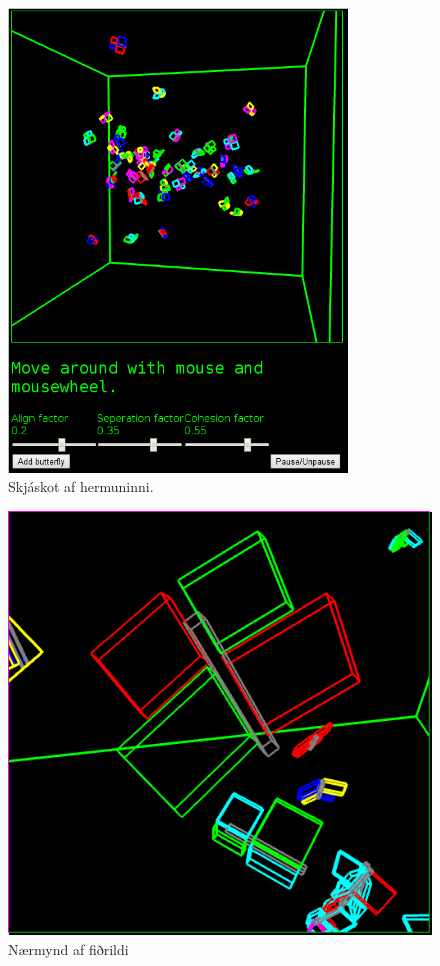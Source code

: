 \documentclass[12pt]{article}
\begin{document}
\begin{figure}[H]
  \centering
  \includegraphics[width=9cm]{butterfly.png}
  \caption{Skjáskot af hermuninni.}
  \label{fig:butterfly}
\end{figure}
\begin{figure}[H]
  \centering
  \includegraphics[width=12cm]{butterfly2.png}
  \caption{Nærmynd af fiðrildi}
  \label{fig:butterfly2}
\end{figure}
\end{document}
